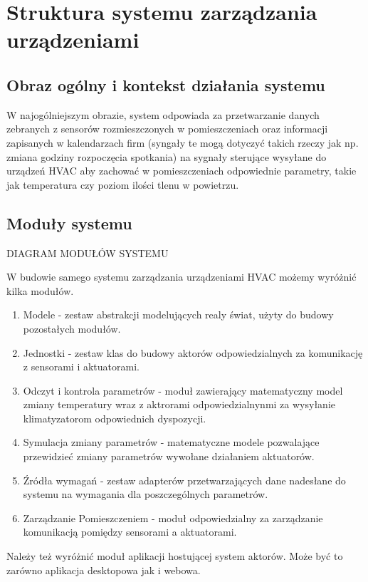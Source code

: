 \chapter{Struktura systemu zarządzania urządzeniami}

\section{Obraz ogólny i kontekst działania systemu}

W najogólniejszym obrazie, system odpowiada za przetwarzanie danych zebranych z sensorów rozmieszczonych w pomieszczeniach oraz informacji zapisanych w kalendarzach firm (syngały te mogą dotyczyć takich rzeczy jak np. zmiana godziny rozpoczęcia spotkania) na sygnały sterujące wysyłane do urządzeń HVAC aby zachować w pomieszczeniach odpowiednie parametry, takie jak temperatura czy poziom ilości tlenu w powietrzu. 

\section{Moduły systemu}
DIAGRAM MODUŁÓW SYSTEMU
% 

W budowie samego systemu zarządzania urządzeniami HVAC możemy wyróżnić kilka modułów.
\begin{enumerate}
    \item Modele - zestaw abstrakcji modelujących realy świat, użyty do budowy pozostałych modułów.  
    \item Jednostki - zestaw klas do budowy aktorów odpowiedzialnych za komunikację z sensorami i aktuatorami.
    \item Odczyt i kontrola parametrów - moduł zawierający matematyczny model zmiany temperatury wraz z aktrorami odpowiedzialnynmi za wysyłanie klimatyzatorom odpowiednich dyspozycji.
    \item Symulacja zmiany parametrów - matematyczne modele pozwalające przewidzieć zmiany parametrów wywołane działaniem aktuatorów.
    \item Źródła wymagań - zestaw adapterów przetwarzających dane nadesłane do systemu na wymagania dla poszczególnych parametrów. 
    \item Zarządzanie Pomieszczeniem - moduł odpowiedzialny za zarządzanie komunikacją pomiędzy sensorami a aktuatorami. 
\end{enumerate}

Należy też wyróżnić moduł aplikacji hostującej system aktorów. 
Może być to zarówno aplikacja desktopowa jak i webowa. 

